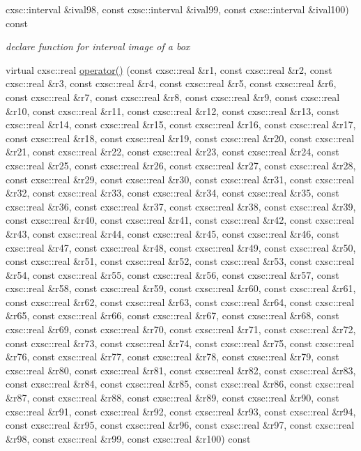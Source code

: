 \begin{DoxyCompactItemize}
cxsc\-::interval \&ival98, const cxsc\-::interval \&ival99, const cxsc\-::interval \&ival100) const 
\begin{DoxyCompactList}\small\item\em declare function for interval image of a box \end{DoxyCompactList}\item 
virtual cxsc\-::real \hyperlink{classRosenFobj100D_a0fcd3fc10a477991fd44ef3f27d4005a}{operator()} (const cxsc\-::real \&r1, const cxsc\-::real \&r2, const cxsc\-::real \&r3, const cxsc\-::real \&r4, const cxsc\-::real \&r5, const cxsc\-::real \&r6, const cxsc\-::real \&r7, const cxsc\-::real \&r8, const cxsc\-::real \&r9, const cxsc\-::real \&r10, const cxsc\-::real \&r11, const cxsc\-::real \&r12, const cxsc\-::real \&r13, const cxsc\-::real \&r14, const cxsc\-::real \&r15, const cxsc\-::real \&r16, const cxsc\-::real \&r17, const cxsc\-::real \&r18, const cxsc\-::real \&r19, const cxsc\-::real \&r20, const cxsc\-::real \&r21, const cxsc\-::real \&r22, const cxsc\-::real \&r23, const cxsc\-::real \&r24, const cxsc\-::real \&r25, const cxsc\-::real \&r26, const cxsc\-::real \&r27, const cxsc\-::real \&r28, const cxsc\-::real \&r29, const cxsc\-::real \&r30, const cxsc\-::real \&r31, const cxsc\-::real \&r32, const cxsc\-::real \&r33, const cxsc\-::real \&r34, const cxsc\-::real \&r35, const cxsc\-::real \&r36, const cxsc\-::real \&r37, const cxsc\-::real \&r38, const cxsc\-::real \&r39, const cxsc\-::real \&r40, const cxsc\-::real \&r41, const cxsc\-::real \&r42, const cxsc\-::real \&r43, const cxsc\-::real \&r44, const cxsc\-::real \&r45, const cxsc\-::real \&r46, const cxsc\-::real \&r47, const cxsc\-::real \&r48, const cxsc\-::real \&r49, const cxsc\-::real \&r50, const cxsc\-::real \&r51, const cxsc\-::real \&r52, const cxsc\-::real \&r53, const cxsc\-::real \&r54, const cxsc\-::real \&r55, const cxsc\-::real \&r56, const cxsc\-::real \&r57, const cxsc\-::real \&r58, const cxsc\-::real \&r59, const cxsc\-::real \&r60, const cxsc\-::real \&r61, const cxsc\-::real \&r62, const cxsc\-::real \&r63, const cxsc\-::real \&r64, const cxsc\-::real \&r65, const cxsc\-::real \&r66, const cxsc\-::real \&r67, const cxsc\-::real \&r68, const cxsc\-::real \&r69, const cxsc\-::real \&r70, const cxsc\-::real \&r71, const cxsc\-::real \&r72, const cxsc\-::real \&r73, const cxsc\-::real \&r74, const cxsc\-::real \&r75, const cxsc\-::real \&r76, const cxsc\-::real \&r77, const cxsc\-::real \&r78, const cxsc\-::real \&r79, const cxsc\-::real \&r80, const cxsc\-::real \&r81, const cxsc\-::real \&r82, const cxsc\-::real \&r83, const cxsc\-::real \&r84, const cxsc\-::real \&r85, const cxsc\-::real \&r86, const cxsc\-::real \&r87, const cxsc\-::real \&r88, const cxsc\-::real \&r89, const cxsc\-::real \&r90, const cxsc\-::real \&r91, const cxsc\-::real \&r92, const cxsc\-::real \&r93, const cxsc\-::real \&r94, const cxsc\-::real \&r95, const cxsc\-::real \&r96, const cxsc\-::real \&r97, const cxsc\-::real \&r98, const cxsc\-::real \&r99, const cxsc\-::real \&r100) const 

\end{DoxyCompactItemize}
